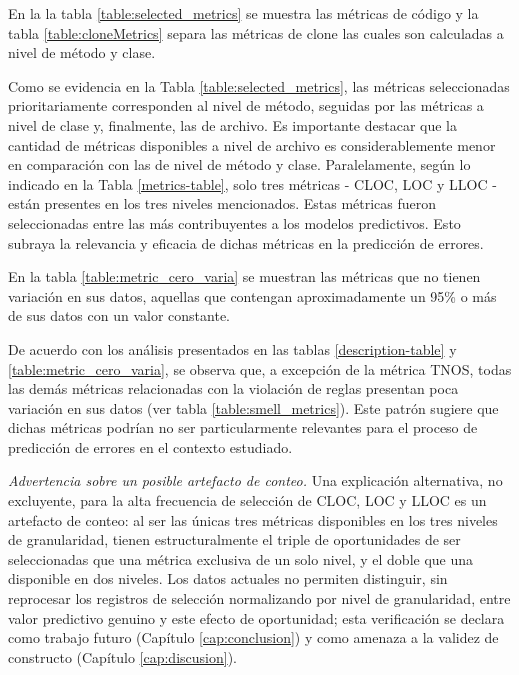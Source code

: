 En la la tabla \ref{table:selected_metrics} se muestra las métricas de código y la tabla \ref{table:cloneMetrics} separa las métricas de clone \cite{ferenc_automatically_2020} las cuales son calculadas a nivel de método y clase.



Como se evidencia en la Tabla \ref{table:selected_metrics}, las métricas seleccionadas prioritariamente corresponden al nivel de método, seguidas por las métricas a nivel de clase y, finalmente, las de archivo. Es importante destacar que la cantidad de métricas disponibles a nivel de archivo es considerablemente menor en comparación con las de nivel de método y clase. Paralelamente, según lo indicado en la Tabla \ref{metrics-table}, solo tres métricas - CLOC, LOC y LLOC - están presentes en los tres niveles mencionados. Estas métricas fueron seleccionadas entre las más contribuyentes a los modelos predictivos. Esto subraya la relevancia y eficacia de dichas métricas en la predicción de errores.




En la tabla \ref{table:metric_cero_varia} se muestran las métricas que no tienen variación en sus datos, aquellas que contengan aproximadamente un 95\% o más de sus datos con un valor constante. 

 

De acuerdo con los análisis presentados en las tablas \ref{description-table} y \ref{table:metric_cero_varia}, se observa que, a excepción de la métrica TNOS, todas las demás métricas relacionadas con la violación de reglas presentan poca variación en sus datos (ver tabla \ref{table:smell_metrics}). Este patrón sugiere que dichas métricas podrían no ser particularmente relevantes para el proceso de predicción de errores en el contexto estudiado.

\textit{Advertencia sobre un posible artefacto de conteo.} Una explicación alternativa, no excluyente, para la alta frecuencia de selección de CLOC, LOC y LLOC es un artefacto de conteo: al ser las únicas tres métricas disponibles en los tres niveles de granularidad, tienen estructuralmente el triple de oportunidades de ser seleccionadas que una métrica exclusiva de un solo nivel, y el doble que una disponible en dos niveles. Los datos actuales no permiten distinguir, sin reprocesar los registros de selección normalizando por nivel de granularidad, entre valor predictivo genuino y este efecto de oportunidad; esta verificación se declara como trabajo futuro (Capítulo \ref{cap:conclusion}) y como amenaza a la validez de constructo (Capítulo \ref{cap:discusion}).

